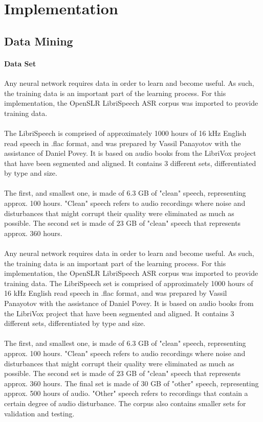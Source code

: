 \chapter{Implementation}\label{ch:implementation}

\section{Data Mining} \label{sec:DataMining}
\subsubsection{Data Set}
Any neural network requires data in order to learn and become useful. As such, the training data is an important part of the learning process. For this implementation, the OpenSLR LibriSpeech ASR corpus was imported to provide training data.\\\\
The LibriSpeech is comprised of approximately 1000 hours of 16 kHz English read speech in .flac format, and was prepared by Vassil Panayotov with the assistance of Daniel Povey. It is based on audio books from the LibriVox project that have been segmented and aligned. It contains 3 different sets, differentiated by type and size.\\\\
The first, and smallest one, is made of 6.3 GB of "clean" speech, representing approx. 100 hours. "Clean" speech refers to audio recordings where noise and disturbances that might corrupt their quality were eliminated as much as possible.
The second set is made of 23 GB of "clean" speech that represents approx. 360 hours.\\\\
Any neural network requires data in order to learn and become useful. As such, the training data is an important part of the learning process. For this implementation, the OpenSLR LibriSpeech ASR corpus was imported to provide training data.
The LibriSpeech set is comprised of approximately 1000 hours of 16 kHz English read speech in .flac format, and was prepared by Vassil Panayotov with the assistance of Daniel Povey. It is based on audio books from the LibriVox project that have been segmented and aligned. It contains 3 different sets, differentiated by type and size.\\\\
The first, and smallest one, is made of 6.3 GB of "clean" speech, representing approx. 100 hours. "Clean" speech refers to audio recordings where noise and disturbances that might corrupt their quality were eliminated as much as possible.
The second set is made of 23 GB of "clean" speech that represents approx. 360 hours.
The final set is made of 30 GB of "other" speech, representing approx. 500 hours of audio. "Other" speech refers to recordings that contain a certain degree of audio disturbance.
The corpus also contains smaller sets for validation and testing.

